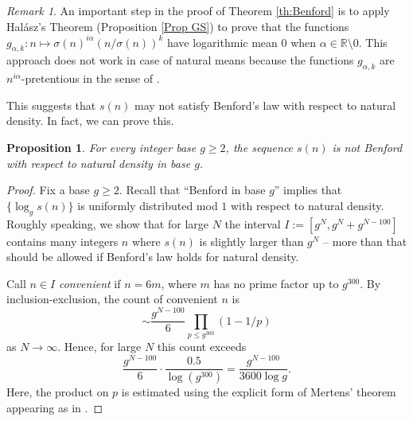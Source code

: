 \documentclass[11pt, reqno]{amsart}
\newtheorem{proposition}[theorem]{Proposition}
\theoremstyle{remark}
\newtheorem*{remark}{Remark}
\numberwithin{theorem}{section}
\numberwithin{proposition}{section}
\numberwithin{lemma}{section}
\numberwithin{corollary}{section}
\numberwithin{equation}{section}
\numberwithin{conjecture}{section}
\numberwithin{definition}{section}
\newcommand{\R}{\mathbb{R}}
\begin{document}
\begin{remark} An important step in the proof of Theorem \ref{th:Benford} is to apply Hal\'{a}sz's Theorem (Proposition \ref{Prop GS}) to prove that the functions $g_{\alpha,k} : n\mapsto \sigma (n)^{i\alpha} (n/\sigma (n))^k$ have logarithmic mean $0$ when $\alpha\in\R\setminus{0}$. This approach does not work in case of natural means because the functions $g_{\alpha, k}$ are $n^{i\alpha}$-pretentious in the sense of \cite{GranvilleSoundararajan}.
 
This suggests that $s(n)$ may not satisfy Benford's law with respect to natural density. In fact, we can prove this.

\begin{proposition} For every integer base $g\geq 2$, the sequence $s(n)$ is not Benford with respect to natural density in base $g$. \end{proposition}


\begin{proof} Fix a base $g \ge 2$. Recall that ``Benford in base $g$'' implies that $\{\log_g s(n)\}$ is uniformly distributed mod $1$ with respect to natural density. Roughly speaking, we show that for large $N$ the interval $I:=[g^N, g^N + g^{N-100}]$ contains many integers $n$ where $s(n)$ is slightly larger than $g^N$ -- more than that should be allowed if Benford's law holds for natural density. 

Call $n \in I$ \emph{convenient} if $n=6m$, where $m$ has no prime factor up to $g^{300}$. By inclusion-exclusion, the count of convenient $n$ is  
\[      \sim \frac{g^{N-100}}{6} \prod_{p \le g^{300}} (1-1/p) \] as $N\to\infty.$
Hence, for large $N$ this count exceeds
\[  \frac{g^{N-100}}{6} \cdot \frac{0.5}{\log(g^{300})} = \frac{g^{N-100}}{3600 \log g}. \]
Here, the product on $p$ is estimated using the explicit form of Mertens' theorem appearing as in \cite[eq.\ (3.25)]{rosser-schoenfeld}.


\end{proof}
\end{remark}
\end{document}
